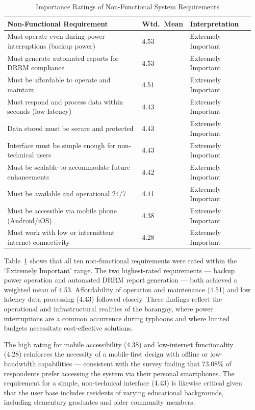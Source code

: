 \documentclass{research}
\begin{document}
\begin{table}[htbp]
\centering
\small
\caption{Importance Ratings of Non-Functional System Requirements}
\label{tab:nonfunc}
\begin{tabular}{p{9.8cm}|p{1.4cm}|p{2.8cm}}
\hline
\textbf{Non-Functional Requirement} & \textbf{Wtd.\ Mean} & \textbf{Interpretation} \\
\hline
Must operate even during power interruptions (backup power)
  & 4.53 & Extremely Important \\[3pt]
Must generate automated reports for DRRM compliance
  & 4.53 & Extremely Important \\[3pt]
Must be affordable to operate and maintain
  & 4.51 & Extremely Important \\[3pt]
Must respond and process data within seconds (low latency)
  & 4.43 & Extremely Important \\[3pt]
Data stored must be secure and protected
  & 4.43 & Extremely Important \\[3pt]
Interface must be simple enough for non-technical users
  & 4.43 & Extremely Important \\[3pt]
Must be scalable to accommodate future enhancements
  & 4.42 & Extremely Important \\[3pt]
Must be available and operational 24/7
  & 4.41 & Extremely Important \\[3pt]
Must be accessible via mobile phone (Android/iOS)
  & 4.38 & Extremely Important \\[3pt]
Must work with low or intermittent internet connectivity
  & 4.28 & Extremely Important \\
\hline
\end{tabular}
\end{table}
 
Table~\ref{tab:nonfunc} shows that all ten non-functional requirements were rated within
the `Extremely Important' range. The two highest-rated requirements --- backup power
operation and automated DRRM report generation --- both achieved a weighted mean of
4.53. Affordability of operation and maintenance (4.51) and low latency data processing
(4.43) followed closely. These findings reflect the operational and infrastructural
realities of the barangay, where power interruptions are a common occurrence during
typhoons and where limited budgets necessitate cost-effective solutions.
 
The high rating for mobile accessibility (4.38) and low-internet functionality (4.28)
reinforces the necessity of a mobile-first design with offline or low-bandwidth
capabilities --- consistent with the survey finding that 73.08\% of respondents prefer
accessing the system via their personal smartphones. The requirement for a simple,
non-technical interface (4.43) is likewise critical given that the user base includes
residents of varying educational backgrounds, including elementary graduates and older
community members.
 
\end{document}
